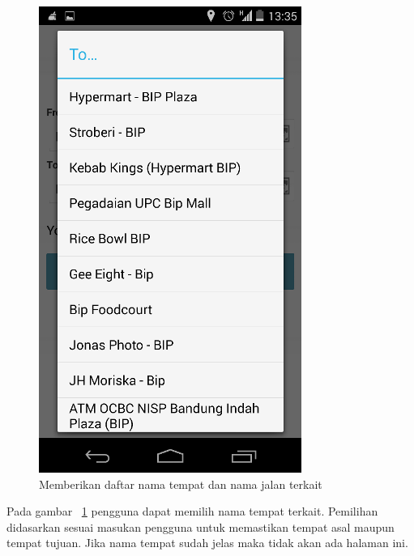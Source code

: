 \begin{figure}[h]
	\centering
		\includegraphics[scale=0.5]{Gambar/KIRI_Android/terkait}
	\caption{Memberikan daftar nama tempat dan nama jalan terkait}
	\label{fig:terkait}
\end{figure}

Pada gambar ~\ref{fig:terkait} pengguna dapat memilih nama tempat terkait. Pemilihan didasarkan sesuai masukan pengguna untuk memastikan tempat asal maupun tempat tujuan. Jika nama tempat sudah jelas maka tidak akan ada halaman ini.

